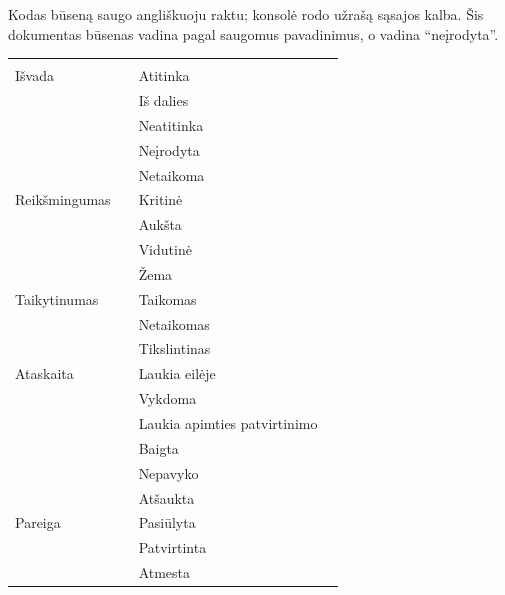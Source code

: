 Kodas būseną saugo angliškuoju raktu; konsolė rodo užrašą sąsajos kalba. Šis dokumentas
būsenas vadina pagal saugomus pavadinimus, o  vadina \enquote{neįrodyta}.

\begin{xltabular}{\textwidth}{@{}L{26mm}L{26mm}L{40mm}Y@{}}
\toprule
{} &  &  &  \\
\midrule
\endfirsthead
\toprule
{} &  &  &  \\
\midrule
\endhead
\bottomrule
\endlastfoot
Išvada &  & Atitinka &  \\
 &  & Iš dalies &  \\
 &  & Neatitinka &  \\
 &  & Neįrodyta &  \\
 &  & Netaikoma &  \\
\midrule
Reikšmingumas &  & Kritinė &  \\
 &  & Aukšta &  \\
 &  & Vidutinė &  \\
 &  & Žema &  \\
\midrule
Taikytinumas &  & Taikomas &  \\
 &  & Netaikomas &  \\
 &  & Tikslintinas &  \\
\midrule
Ataskaita &  & Laukia eilėje &  \\
 &  & Vykdoma &  \\
 &  & Laukia apimties patvirtinimo &  \\
 &  & Baigta &  \\
 &  & Nepavyko &  \\
 &  & Atšaukta &  \\
\midrule
Pareiga &  & Pasiūlyta &  \\
 &  & Patvirtinta &  \\
 &  & Atmesta &  \\

\end{xltabular}
